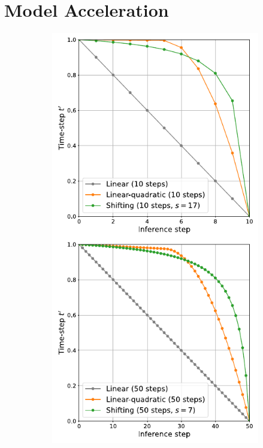 \section{Model Acceleration}
\label{sec:accelerate}

\begin{figure}[htbp]
    \centering
    \begin{subfigure}[b]{0.28\textwidth} %
        \centering
        \includegraphics[width=\textwidth]{figures/shifting.pdf}

\end{subfigure}
\end{figure}
